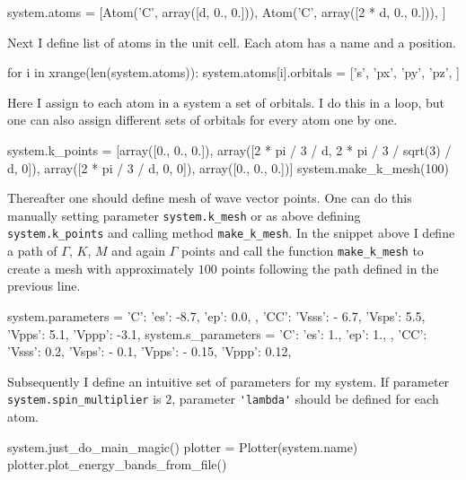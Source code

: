 \begin{python}
system.atoms = [Atom('C', array([d, 0., 0.])),
                Atom('C', array([2 * d, 0., 0.])), ]
\end{python}

Next I define list of atoms in the unit cell. Each atom has a name and a position.

\begin{python}
for i in xrange(len(system.atoms)):
    system.atoms[i].orbitals = ['s', 'px', 'py', 'pz', ]
\end{python}

Here I assign to each atom in a system a set of orbitals. I do this in a loop, but one can also assign different sets of orbitals for every atom one by one.

\begin{python}
system.k_points = [array([0., 0., 0.]),
                   array([2 * pi / 3 / d, 2 * pi / 3 / sqrt(3) / d, 0]),
                   array([2 * pi / 3 / d, 0, 0]),
                   array([0., 0., 0.])]
system.make_k_mesh(100)
\end{python}

Thereafter one should define mesh of wave vector points. One can do this manually setting parameter \verb!system.k_mesh! or as above defining \verb!system.k_points! and calling method \verb!make_k_mesh!. In the snippet above I define a path of $\Gamma$, $K$, $M$ and again $\Gamma$ points and call the function \verb!make_k_mesh! to create a mesh with approximately $100$ points following the path defined in the previous line.

\begin{python}
system.parameters = {
    'C': {
        'es': -8.7,
        'ep': 0.0,
    },
    'CC': {
        'Vsss': - 6.7,
        'Vsps': 5.5,
        'Vpps': 5.1,
        'Vppp': -3.1,
    }
}
system.s_parameters = {
    'C': {
        'es': 1.,
        'ep': 1.,
    },
    'CC': {
        'Vsss': 0.2,
        'Vsps': - 0.1,
        'Vpps': - 0.15,
        'Vppp': 0.12,
    }
}
\end{python}

Subsequently I define an intuitive set of parameters for my system. If parameter \verb!system.spin_multiplier! is $2$, parameter \verb!'lambda'! should be defined for each atom.

\begin{python}
system.just_do_main_magic()
plotter = Plotter(system.name)
plotter.plot_energy_bands_from_file()
\end{python}

